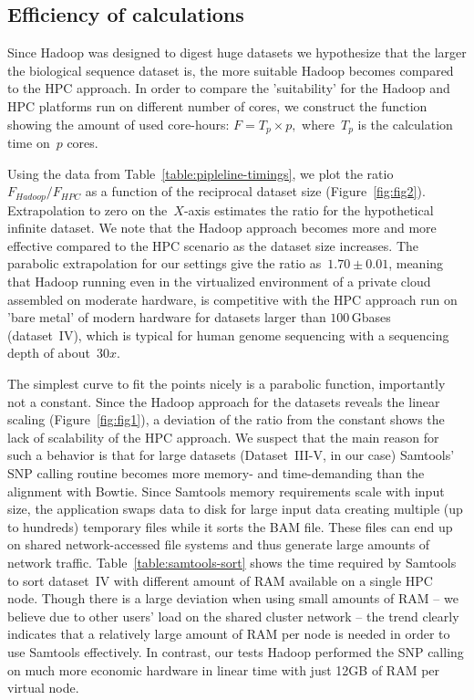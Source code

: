 \documentclass{bioinfo}
\begin{document}
\subsection*{Efficiency of calculations}

Since Hadoop was designed to digest huge datasets\citep{hadoop,lin2010} we hypothesize that the larger the biological sequence dataset is, the more suitable Hadoop becomes compared to the HPC approach. In order to compare the 'suitability' for the Hadoop and HPC platforms run on different number of cores, we construct the function showing the amount of used core-hours:
$F=T_{p}\times p,$ where~$T_{p}$ is the calculation time on~$p$ cores. 

Using the data from Table~\ref{table:pipleline-timings}, we plot the ratio $F_{Hadoop}/F_{HPC}$ as a function of the reciprocal dataset size (Figure~\ref{fig:fig2}). Extrapolation to zero on the~$X$-axis estimates the ratio for the hypothetical infinite dataset. We note that the Hadoop approach becomes more and more effective compared to the HPC scenario as the dataset size increases. 
The parabolic extrapolation for our settings give the ratio as~$1.70\pm0.01$, meaning that Hadoop running even in the virtualized environment of a private cloud assembled on moderate hardware, is competitive with the HPC approach run on 'bare metal' of modern hardware for datasets larger than $100$\,Gbases (dataset~IV), which is typical for human genome sequencing with a sequencing depth of about~$30x$.


The simplest curve to fit the points nicely is a parabolic function, importantly not a constant. 
Since the Hadoop approach for the datasets reveals the linear scaling (Figure~\ref{fig:fig1}), a deviation of the ratio from the constant shows the 
lack of scalability of the HPC approach.
We suspect that the main reason for such a behavior is that for large datasets
(Dataset~III-V, in our case) Samtools' SNP calling routine becomes more memory-
and time-demanding than the alignment with Bowtie.  Since Samtools memory
requirements scale with input size, the application swaps
data to disk for large input data creating multiple (up to hundreds) temporary files while it sorts
the BAM file. These files can end up on shared network-accessed
file systems and thus generate large amounts of network traffic.
Table~\ref{table:samtools-sort} shows the time required by Samtools to sort dataset~IV with
different amount of RAM available on a single HPC node. Though there is a large
deviation when using small amounts of RAM -- we believe due to other users' load
on the shared cluster network -- the trend clearly indicates that a relatively
large amount of RAM per node is needed in order to use Samtools effectively. In
contrast, our tests Hadoop performed the SNP calling on much more economic
hardware in linear time with just 12GB of RAM per virtual node.
\end{document}
